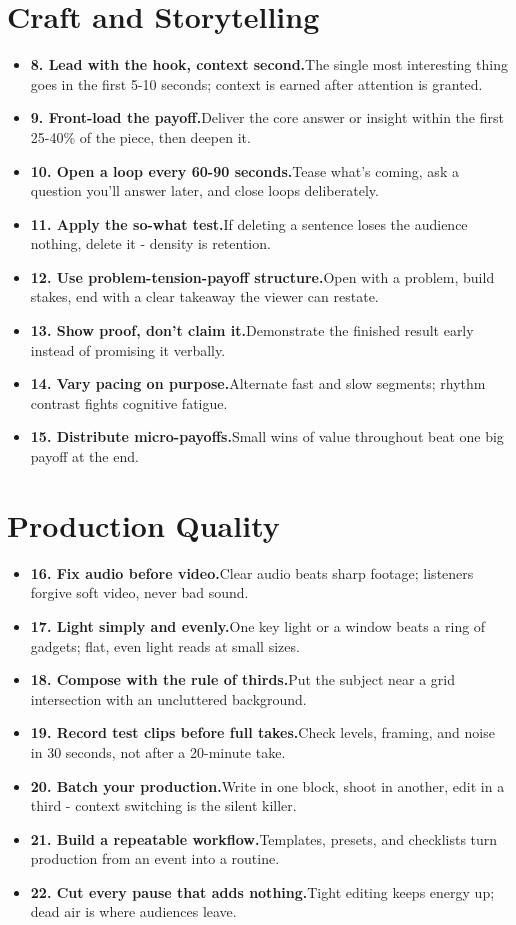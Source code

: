 \documentclass[11pt]{article}
\newcommand{\tip}[2]{\item \textbf{#1.}\enspace #2}
\newcommand{\tlabel}{\textcolor{accent}{\small$\blacktriangleright$}}
\begin{document}
\section*{Craft and Storytelling}
\begin{itemize}[label=\tlabel]
\tip{8. Lead with the hook, context second}{The single most interesting thing goes in the first 5-10 seconds; context is earned after attention is granted.}
\tip{9. Front-load the payoff}{Deliver the core answer or insight within the first 25-40\% of the piece, then deepen it.}
\tip{10. Open a loop every 60-90 seconds}{Tease what's coming, ask a question you'll answer later, and close loops deliberately.}
\tip{11. Apply the so-what test}{If deleting a sentence loses the audience nothing, delete it - density is retention.}
\tip{12. Use problem-tension-payoff structure}{Open with a problem, build stakes, end with a clear takeaway the viewer can restate.}
\tip{13. Show proof, don't claim it}{Demonstrate the finished result early instead of promising it verbally.}
\tip{14. Vary pacing on purpose}{Alternate fast and slow segments; rhythm contrast fights cognitive fatigue.}
\tip{15. Distribute micro-payoffs}{Small wins of value throughout beat one big payoff at the end.}
\end{itemize}
\section*{Production Quality}
\begin{itemize}[label=\tlabel]
\tip{16. Fix audio before video}{Clear audio beats sharp footage; listeners forgive soft video, never bad sound.}
\tip{17. Light simply and evenly}{One key light or a window beats a ring of gadgets; flat, even light reads at small sizes.}
\tip{18. Compose with the rule of thirds}{Put the subject near a grid intersection with an uncluttered background.}
\tip{19. Record test clips before full takes}{Check levels, framing, and noise in 30 seconds, not after a 20-minute take.}
\tip{20. Batch your production}{Write in one block, shoot in another, edit in a third - context switching is the silent killer.}
\tip{21. Build a repeatable workflow}{Templates, presets, and checklists turn production from an event into a routine.}
\tip{22. Cut every pause that adds nothing}{Tight editing keeps energy up; dead air is where audiences leave.}
\end{itemize}
\end{document}
